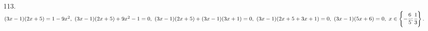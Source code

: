 113. $(3x-1)(2x+5)=1-9x^2,\ (3x-1)(2x+5)+9x^2-1=0,\ (3x-1)(2x+5)+(3x-1)(3x+1)=0,\ (3x-1)(2x+5+3x+1)=0,\ (3x-1)(5x+6)=0,\ x\in\left\{-\cfrac{6}{5};\cfrac{1}{3}\right\}.$\\
